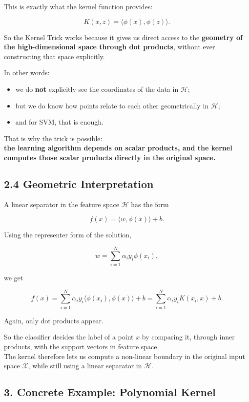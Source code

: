\documentclass[
  italian,
  11pt,
]{article}
\providecommand{\tightlist}{%
  \setlength{\itemsep}{0pt}\setlength{\parskip}{0pt}}
\begin{document}
This is exactly what the kernel function provides:

\[
K(x,z)=\langle \phi(x),\phi(z)\rangle.
\]

So the Kernel Trick works because it gives us direct access to the
\textbf{geometry of the high-dimensional space through dot products},
without ever constructing that space explicitly.

In other words:

\begin{itemize}
\tightlist
\item
  we do \textbf{not} explicitly see the coordinates of the data in
  \(\mathcal H\);
\item
  but we do know how points relate to each other geometrically in
  \(\mathcal H\);
\item
  and for SVM, that is enough.
\end{itemize}

That is why the trick is possible:\\
\textbf{the learning algorithm depends on scalar products, and the
kernel computes those scalar products directly in the original space.}

\newpage

\subsection{2.4 Geometric
Interpretation}\label{geometric-interpretation}

A linear separator in the feature space \(\mathcal H\) has the form

\[
f(x)=\langle w,\phi(x)\rangle + b.
\]

Using the representer form of the solution,

\[
w=\sum_{i=1}^N \alpha_i y_i \phi(x_i),
\]

we get

\[
f(x)=\sum_{i=1}^N \alpha_i y_i \langle \phi(x_i),\phi(x)\rangle + b
=
\sum_{i=1}^N \alpha_i y_i K(x_i,x)+b.
\]

Again, only dot products appear.

So the classifier decides the label of a point \(x\) by comparing it,
through inner products, with the support vectors in feature space.\\
The kernel therefore lets us compute a non-linear boundary in the
original input space \(\mathcal X\), while still using a linear
separator in \(\mathcal H\).

\subsection{3. Concrete Example: Polynomial
Kernel}\label{concrete-example-polynomial-kernel}
\end{document}
